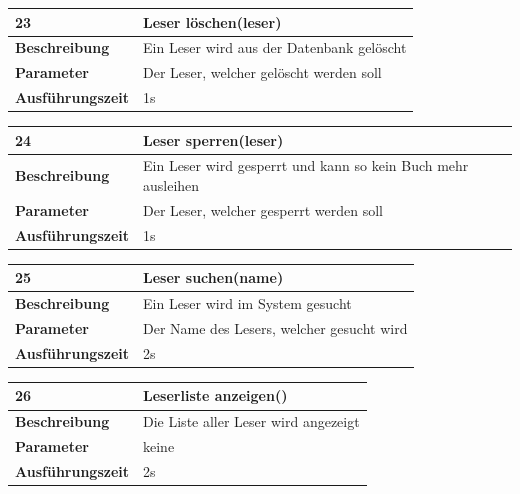 \documentclass[fontsize=12pt,paper=a4,twoside]{scrartcl}
\begin{document}
\begin{table}
	[H] \label{a23} 
	\begin{tabular}
		{|l|p{10cm}|} \hline \textbf{23} & \textbf{Leser löschen(leser)} \\
		\hline \textbf{Beschreibung} & Ein Leser wird aus der Datenbank gelöscht\\
		\hline \textbf{Parameter} & Der Leser, welcher gelöscht werden soll \\
		\hline \textbf{Ausführungszeit} & 1s\\
		\hline 
	\end{tabular}
\end{table}
\begin{table}
	[H] \label{a24} 
	\begin{tabular}
		{|l|p{10cm}|} \hline \textbf{24} & \textbf{Leser sperren(leser)} \\
		\hline \textbf{Beschreibung} & Ein Leser wird gesperrt und kann so kein Buch mehr ausleihen\\
		\hline \textbf{Parameter} & Der Leser, welcher gesperrt werden soll \\
		\hline \textbf{Ausführungszeit} & 1s\\
		\hline 
	\end{tabular}
\end{table}
\begin{table}
	[H] \label{a25} 
	\begin{tabular}
		{|l|p{10cm}|} \hline \textbf{25} & \textbf{Leser suchen(name)} \\
		\hline \textbf{Beschreibung} & Ein Leser wird im System gesucht\\
		\hline \textbf{Parameter} & Der Name des Lesers, welcher gesucht wird \\
		\hline \textbf{Ausführungszeit} & 2s\\
		\hline 
	\end{tabular}
\end{table}
\begin{table}
	[H] \label{a26} 
	\begin{tabular}
		{|l|p{10cm}|} \hline \textbf{26} & \textbf{Leserliste anzeigen()} \\
		\hline \textbf{Beschreibung} & Die Liste aller Leser wird angezeigt\\
		\hline \textbf{Parameter} & keine \\
		\hline \textbf{Ausführungszeit} & 2s\\
		\hline 
	\end{tabular}
\end{table}
\end{document}
